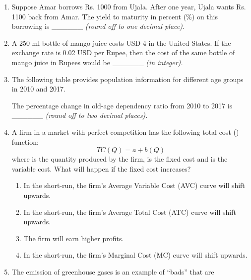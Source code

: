 \documentclass[12pt]{article}
\theoremstyle{remark}
\begin{document}
\begin{enumerate}
\hfill{}
\item Suppose Amar borrows Rs. 1000 from Ujala. After one year, Ujala wants Rs. 1100 back from Amar. The yield to maturity in percent (\%) on this borrowing is \_\_\_\_\_\_ \textit{(round off to one decimal place).} 
\hfill{}
\item A 250 ml bottle of mango juice costs USD 4 in the United States. If the exchange rate is 0.02 USD per Rupee, then the cost of the same bottle of mango juice in Rupees would be \_\_\_\_\_\_ \textit{(in integer).} 
\hfill{}
\item The following table provides population information for different age groups in 2010 and 2017. 
\begin{centering}
\begin{table}[H]

\caption{}
\label{Table 1.1}
\end{table}
\end{centering}
The percentage change in old-age dependency ratio from 2010 to 2017 is \_\_\_\_\_\_ \textit{(round off to two decimal places).}
\hfill{}
\item A firm in a market with perfect competition has the following total cost () function:
$$
TC(Q) = a + b(Q)
$$
where  is the quantity produced by the firm,  is the fixed cost and  is the variable cost. What will happen if the fixed cost increases? \\
\begin{enumerate} 
\item   In the short-run, the firm’s Average Variable Cost (AVC) curve will shift upwards. 
\item   In the short-run, the firm’s Average Total Cost (ATC) curve will shift upwards. 
\item   The firm will earn higher profits. 
\item   In the short-run, the firm’s Marginal Cost (MC) curve will shift upwards.
\end{enumerate}
\hfill{}
\item   The emission of greenhouse gases is an example of “bads” that are
\begin{enumerate} 
\end{enumerate}
\end{enumerate}
\end{document}

